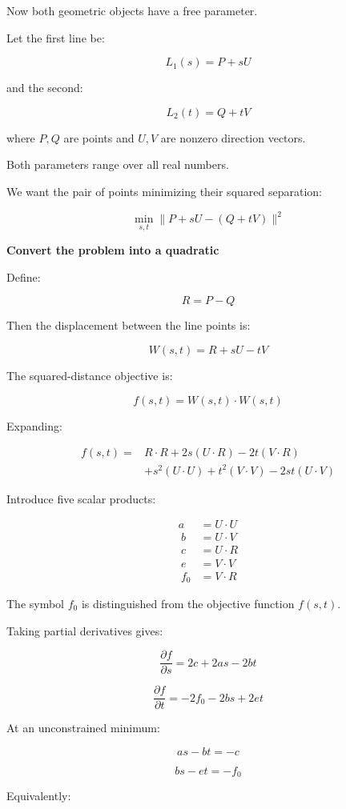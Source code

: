 Now both geometric objects have a free parameter.

Let the first line be:

\[
L_1(s)=P+sU
\]

and the second:

\[
L_2(t)=Q+tV
\]

where \(P,Q\) are points and \(U,V\) are nonzero direction vectors.

Both parameters range over all real numbers.

We want the pair of points minimizing their squared separation:

\[
\boxed{ \min_{s,t}\|P+sU-(Q+tV)\|^2 }
\]

\textbf{Convert the problem into a quadratic}

Define:

\[
R=P-Q
\]

Then the displacement between the line points is:

\[
W(s,t)=R+sU-tV
\]

The squared-distance objective is:

\[
f(s,t)=W(s,t)\cdot W(s,t)
\]

Expanding:

\[
\begin{aligned} f(s,t) ={}&R\cdot R+2s(U\cdot R)-2t(V\cdot R)\\\ &+s^2(U\cdot U)+t^2(V\cdot V)-2st(U\cdot V) \end{aligned}
\]

Introduce five scalar products:

\[
\begin{aligned} a&=U\cdot U\\\ b&=U\cdot V\\\ c&=U\cdot R\\\ e&=V\cdot V\\\ f_0&=V\cdot R \end{aligned}
\]

The symbol \(f_0\) is distinguished from the objective function \(f(s,t)\).

Taking partial derivatives gives:

\[
\frac{\partial f}{\partial s} = 2c+2as-2bt
\]

\[
\frac{\partial f}{\partial t} = -2f_0-2bs+2et
\]

At an unconstrained minimum:

\[
as-bt=-c
\]

\[
bs-et=-f_0
\]

Equivalently:

